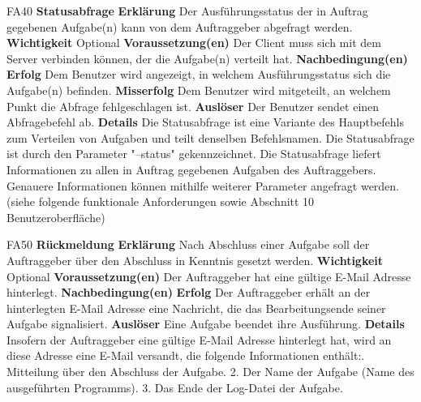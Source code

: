 \documentclass[a4paper,12pt]{article}
\begin{document}
\begin{itemize}[nosep]
\begin{minipage}[t]{\linewidth}
\item[FA40] \textbf{Statusabfrage}
\subitem \textbf{Erklärung} Der Ausführungsstatus der in Auftrag gegebenen Aufgabe(n) kann von dem Auftraggeber abgefragt werden.
\subitem \textbf{Wichtigkeit} Optional
\subitem \textbf{Voraussetzung(en)} Der \gls{Client} muss sich mit dem \gls{Server} verbinden können, der die Aufgabe(n) verteilt hat.
\subitem \textbf{Nachbedingung(en)}
\subsubitem \textbf{Erfolg} Dem \gls{Benutzer} wird angezeigt, in welchem Ausführungsstatus sich die Aufgabe(n) befinden.
\subsubitem \textbf{Misserfolg} Dem \gls{Benutzer} wird mitgeteilt, an welchem Punkt die Abfrage fehlgeschlagen ist.
\subitem \textbf{Auslöser} Der \gls{Benutzer} sendet einen Abfragebefehl ab.
\subitem \textbf{Details} Die Statusabfrage ist eine Variante des Hauptbefehls zum Verteilen von Aufgaben und teilt denselben Befehlsnamen.\newline
Die Statusabfrage ist durch den Parameter "--status" gekennzeichnet.\newline
Die Statusabfrage liefert Informationen zu allen in Auftrag gegebenen Aufgaben des Auftraggebers.\newline
Genauere Informationen können mithilfe weiterer Parameter angefragt werden. (siehe folgende funktionale Anforderungen sowie Abschnitt 10 Benutzeroberfläche)
\end{minipage}
\pagebreak

\begin{minipage}[t]{\linewidth}
\item[FA50] \textbf{Rückmeldung}
\subitem \textbf{Erklärung} Nach Abschluss einer Aufgabe soll der Auftraggeber über den Abschluss in Kenntnis gesetzt werden.
\subitem \textbf{Wichtigkeit} Optional
\subitem \textbf{Voraussetzung(en)} Der Auftraggeber hat eine gültige E-Mail Adresse hinterlegt.
\subitem \textbf{Nachbedingung(en)}
\subsubitem \textbf{Erfolg} Der Auftraggeber erhält an der hinterlegten E-Mail Adresse eine Nachricht, die das Bearbeitungsende seiner Aufgabe signalisiert.
\subitem \textbf{Auslöser} Eine Aufgabe beendet ihre Ausführung.
\subitem \textbf{Details} Insofern der Auftraggeber eine gültige E-Mail Adresse hinterlegt hat, wird an diese Adresse eine E-Mail versandt, die folgende Informationen enthält:. Mitteilung über den Abschluss der Aufgabe.
2. Der Name der Aufgabe (Name des ausgeführten Programms).
3. Das Ende der Log-Datei der Aufgabe.
\end{minipage}
\pagebreak

\end{itemize}
\end{document}
